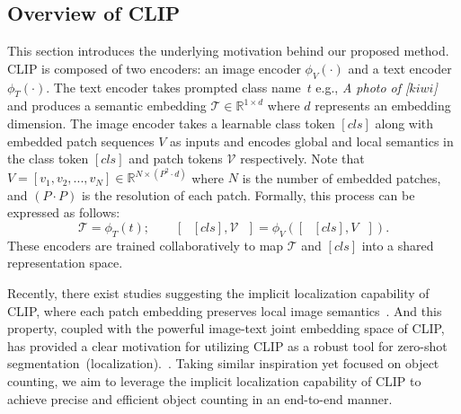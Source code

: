 \subsection{Overview of CLIP}
\label{Method:preliminaries}
This section introduces the underlying motivation behind our proposed method.
CLIP is composed of two encoders: an image encoder $\phi_{V}(\cdot)$ and a text encoder $\phi_{T}(\cdot)$.
The text encoder takes prompted class name~$t$ e.g., \textit{A photo of [$kiwi$]} and produces a semantic embedding $\mathcal{T} \in \mathbb{R}^{1 \times d}$ where $d$ represents an embedding dimension.
The image encoder takes a learnable class token $[cls]$ along with embedded patch sequences $V$ as inputs and encodes global and local semantics in the class token $[cls]$ and patch tokens $\mathcal{V}$ respectively.
Note that $V = [v_1, v_2,...,v_N] \in \mathbb{R}^{N \times (P^2 \cdot d)}$ where $N$ is the number of embedded patches, and $(P \cdot P)$ is the resolution of each patch.
Formally, this process can be expressed as follows:
\begin{equation}
    \mathcal{T} = \phi_{T}(t); \quad\quad[\text{ }[cls],\mathcal{V}\text{ }] = \phi_{V}([\text{ }[cls], V\text{ }]).
\end{equation}
These encoders are trained collaboratively to map $\mathcal{T}$ and $[cls]$ into a shared representation space.


Recently, there exist studies suggesting the implicit localization capability of CLIP, where each patch embedding preserves local image semantics~\cite{2022maskclip, li2023clipsurgery}.
And this property, coupled with the powerful image-text joint embedding space of CLIP, has provided a clear motivation for utilizing CLIP as a robust tool for zero-shot segmentation~(localization).~\cite{li2022languagedriven, rao2022denseclip, luddecke2022image}.
Taking similar inspiration yet focused on object counting, we aim to leverage the implicit localization capability of CLIP to achieve precise and efficient object counting in an end-to-end manner.



